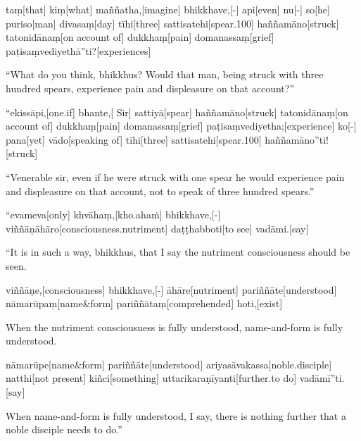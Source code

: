 \begin{samepage}
\begingl[glneveryline={\PaliGlossA,\PaliGlossB}]
taṃ[that] kiṃ[what] maññatha,[imagine] bhikkhave,[-] api[even] nu[-] so[he] puriso[man] divasaṃ[day] tīhi[three] sattisatehi[spear.100] haññamāno[struck] tatonidānaṃ[on account of] dukkhaṃ[pain] domanassaṃ[grief] paṭisaṃvediyethā”ti?[experiences]
\endgl
\nopagebreak
\linespread{0.5}
\begin{spacin}{0.2}
{\PaliGlossFT “What do you think, bhikkhus? Would that man, being struck with three hundred spears, experience pain and displeasure on that account?”}
\end{spacin}
\vskip 12pt
\end{samepage}
\begin{samepage}
\begingl[glneveryline={\PaliGlossA,\PaliGlossB}]
“ekissāpi,[one.if] bhante,[ Sir] sattiyā[spear] haññamāno[struck] tatonidānaṃ[on account of] dukkhaṃ[pain] domanassaṃ[grief] paṭisaṃvediyetha;[experience] ko[-] pana[yet] vādo[speaking of] tīhi[three] sattisatehi[spear.100] haññamāno”ti![struck]
\endgl
\nopagebreak
\linespread{0.5}
\begin{spacin}{0.2}
{\PaliGlossFT “Venerable sir, even if he were struck with one spear he would experience pain and displeasure on that account, not to speak of three hundred spears.”}
\end{spacin}
\vskip 12pt
\end{samepage}
\begin{samepage}
\begingl[glneveryline={\PaliGlossA,\PaliGlossB}]
“evameva[only] khvāhaṃ,[kho.ahaṁ] bhikkhave,[-] viññāṇāhāro[consciousness.nutriment] daṭṭhabboti[to see] vadāmi.[say]
\endgl
\nopagebreak
\linespread{0.5}
\begin{spacin}{0.2}
{\PaliGlossFT “It is in such a way, bhikkhus, that I say the nutriment consciousness should be seen.}
\end{spacin}
\vskip 12pt
\end{samepage}
\begin{samepage}
\begingl[glneveryline={\PaliGlossA,\PaliGlossB}]
viññāṇe,[consciousness] bhikkhave,[-] āhāre[nutriment] pariññāte[understood] nāmarūpaṃ[name\&form] pariññātaṃ[comprehended] hoti,[exist]
\endgl
\nopagebreak
\linespread{0.5}
\begin{spacin}{0.2}
{\PaliGlossFT When the nutriment consciousness is fully understood, name-and-form is fully understood.}
\end{spacin}
\vskip 12pt
\end{samepage}
\begin{samepage}
\begingl[glneveryline={\PaliGlossA,\PaliGlossB}]
nāmarūpe[name\&form] pariññāte[understood] ariyasāvakassa[noble.disciple] natthi[not present] kiñci[something] uttarikaraṇīyanti[further.to do] vadāmī”ti.[say]
\endgl
\nopagebreak
\linespread{0.5}
\begin{spacin}{0.2}
{\PaliGlossFT When name-and-form is fully understood, I say, there is nothing further that a noble disciple needs to do.”}
\end{spacin}
\vskip 12pt
\end{samepage}
